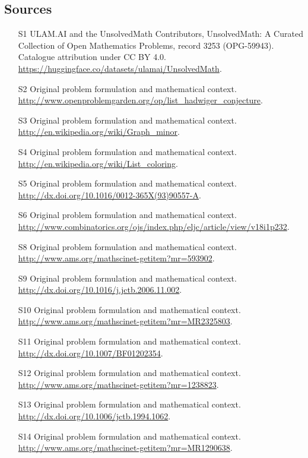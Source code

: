 \documentclass[11pt]{article}
\begin{document}
\subsection{Sources}
\begin{itemize}
\item[\hypertarget{source:3253:1}{S1}] ULAM.AI and the UnsolvedMath Contributors, UnsolvedMath: A Curated Collection of Open Mathematics Problems, record 3253 (OPG-59943). Catalogue attribution under CC BY 4.0.
\url{https://huggingface.co/datasets/ulamai/UnsolvedMath}.
\item[\hypertarget{source:3253:2}{S2}] Original problem formulation and mathematical context.
\url{http://www.openproblemgarden.org/op/list_hadwiger_conjecture}.
\item[\hypertarget{source:3253:3}{S3}] Original problem formulation and mathematical context.
\url{http://en.wikipedia.org/wiki/Graph_minor}.
\item[\hypertarget{source:3253:4}{S4}] Original problem formulation and mathematical context.
\url{http://en.wikipedia.org/wiki/List_coloring}.
\item[\hypertarget{source:3253:5}{S5}] Original problem formulation and mathematical context.
\url{http://dx.doi.org/10.1016/0012-365X(93)90557-A}.
\item[\hypertarget{source:3253:6}{S6}] Original problem formulation and mathematical context.
\url{http://www.combinatorics.org/ojs/index.php/eljc/article/view/v18i1p232}.
\item[\hypertarget{source:3253:8}{S8}] Original problem formulation and mathematical context.
\url{http://www.ams.org/mathscinet-getitem?mr=593902}.
\item[\hypertarget{source:3253:9}{S9}] Original problem formulation and mathematical context.
\url{http://dx.doi.org/10.1016/j.jctb.2006.11.002}.
\item[\hypertarget{source:3253:10}{S10}] Original problem formulation and mathematical context.
\url{http://www.ams.org/mathscinet-getitem?mr=MR2325803}.
\item[\hypertarget{source:3253:11}{S11}] Original problem formulation and mathematical context.
\url{http://dx.doi.org/10.1007/BF01202354}.
\item[\hypertarget{source:3253:12}{S12}] Original problem formulation and mathematical context.
\url{http://www.ams.org/mathscinet-getitem?mr=1238823}.
\item[\hypertarget{source:3253:13}{S13}] Original problem formulation and mathematical context.
\url{http://dx.doi.org/10.1006/jctb.1994.1062}.
\item[\hypertarget{source:3253:14}{S14}] Original problem formulation and mathematical context.
\url{http://www.ams.org/mathscinet-getitem?mr=MR1290638}.
\end{itemize}
\label{end:3253}
\end{document}

